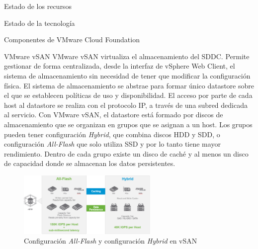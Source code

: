 \begin{chapter}{Estado de los recursos}
\begin{section}{Estado de la tecnología}
\begin{subsection}{Componentes de VMware Cloud Foundation}
\begin{subsubsection}{VMware vSAN}
    VMware vSAN virtualiza el almacenamiento del SDDC. Permite gestionar de forma centralizada, desde la interfaz de vSphere Web Client, el sistema de almacenamiento sin necesidad de tener que modificar la configuración física. El sistema de almacenamiento se abstrae para formar único datastore sobre el que se establecen políticas de uso y disponibilidad. El acceso por parte de cada host al datastore se realiza con el protocolo IP, a través de una subred dedicada al servicio. Con VMware vSAN, el datastore está formado por discos de almacenamiento que se organizan en grupos que se asignan a un host. Los grupos pueden tener configuración \textit{Hybrid}, que combina discos HDD y SDD, o configuración \textit{All-Flash} que solo utiliza SSD y por lo tanto tiene mayor rendimiento. Dentro de cada grupo existe un disco de caché y al menos un disco de capacidad donde se almacenan los datos persistentes\cite{operacionesVSAN}. 
    
    \begin{figure}[h]
    \centering
        \includegraphics[width=0.6\textwidth]{imaxes/cap2recursos/rendimientoVSAN.png}
        \caption{Configuración \textit{All-Flash} y configuración \textit{Hybrid} en vSAN}
        \label{fig:performance-Hybrid-AllFlash-vSAN}
    \end{figure}
    \FloatBarrier
\end{subsubsection}


\end{subsection}
\end{section}
\end{chapter}
